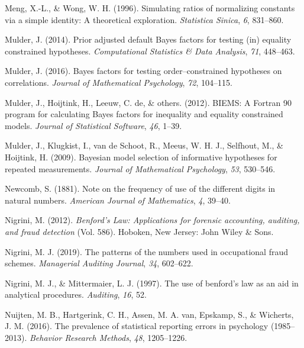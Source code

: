 \documentclass[
  english,
  man,floatsintext]{apa6}
\newlength{\cslhangindent}
\newenvironment{cslreferences}%
  {\setlength{\parindent}{0pt}%
  \everypar{\setlength{\hangindent}{\cslhangindent}}\ignorespaces}%
  {\par}
\begin{document}
\begin{cslreferences}
\leavevmode\hypertarget{ref-meng1996simulating}{}%
Meng, X.-L., \& Wong, W. H. (1996). Simulating ratios of normalizing constants via a simple identity: A theoretical exploration. \emph{Statistica Sinica}, \emph{6}, 831--860.

\leavevmode\hypertarget{ref-mulder2014prior}{}%
Mulder, J. (2014). Prior adjusted default Bayes factors for testing (in) equality constrained hypotheses. \emph{Computational Statistics \& Data Analysis}, \emph{71}, 448--463.

\leavevmode\hypertarget{ref-mulder2016bayes}{}%
Mulder, J. (2016). Bayes factors for testing order--constrained hypotheses on correlations. \emph{Journal of Mathematical Psychology}, \emph{72}, 104--115.

\leavevmode\hypertarget{ref-mulder2012biems}{}%
Mulder, J., Hoijtink, H., Leeuw, C. de, \& others. (2012). BIEMS: A Fortran 90 program for calculating Bayes factors for inequality and equality constrained models. \emph{Journal of Statistical Software}, \emph{46}, 1--39.

\leavevmode\hypertarget{ref-mulder2009bayesian}{}%
Mulder, J., Klugkist, I., van de Schoot, R., Meeus, W. H. J., Selfhout, M., \& Hoijtink, H. (2009). Bayesian model selection of informative hypotheses for repeated measurements. \emph{Journal of Mathematical Psychology}, \emph{53}, 530--546.

\leavevmode\hypertarget{ref-newcomb1881note}{}%
Newcomb, S. (1881). Note on the frequency of use of the different digits in natural numbers. \emph{American Journal of Mathematics}, \emph{4}, 39--40.

\leavevmode\hypertarget{ref-nigrini2012benford}{}%
Nigrini, M. (2012). \emph{Benford's Law: Applications for forensic accounting, auditing, and fraud detection} (Vol. 586). Hoboken, New Jersey: John Wiley \& Sons.

\leavevmode\hypertarget{ref-nigrini2019patterns}{}%
Nigrini, M. J. (2019). The patterns of the numbers used in occupational fraud schemes. \emph{Managerial Auditing Journal}, \emph{34}, 602--622.

\leavevmode\hypertarget{ref-nigrini1997use}{}%
Nigrini, M. J., \& Mittermaier, L. J. (1997). The use of benford's law as an aid in analytical procedures. \emph{Auditing}, \emph{16}, 52.

\leavevmode\hypertarget{ref-nuijten2016prevalence}{}%
Nuijten, M. B., Hartgerink, C. H., Assen, M. A. van, Epskamp, S., \& Wicherts, J. M. (2016). The prevalence of statistical reporting errors in psychology (1985--2013). \emph{Behavior Research Methods}, \emph{48}, 1205--1226.


\end{cslreferences}
\end{document}

